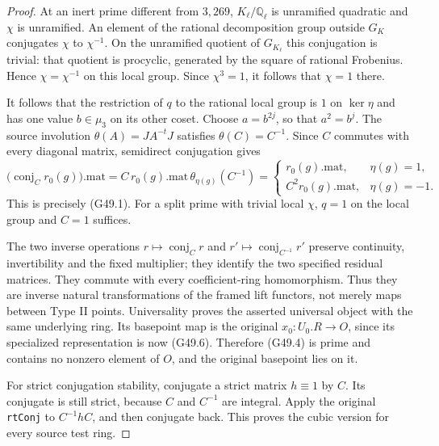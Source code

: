 \begin{proof}
At an inert prime different from $3,269$, $K_\ell/\mathbb Q_\ell$
is unramified quadratic and $\chi$ is unramified.
An element of the rational decomposition group outside $G_K$
conjugates $\chi$ to $\chi^{-1}$.  On the unramified quotient
of $G_{K_\ell}$ this conjugation is trivial: that quotient is
procyclic, generated by the square of rational Frobenius.
Hence $\chi=\chi^{-1}$ on this local group.  Since $\chi^3=1$,
it follows that $\chi=1$ there.

It follows that the restriction of $q$ to the rational local
group is $1$ on $\ker\eta$ and has one value $b\in\mu_3$
on its other coset.  Choose $a=b^{2j}$, so that $a^2=b^j$.
The source involution $\theta(A)=JA^{-t}J$ satisfies
$\theta(C)=C^{-1}$.  Since $C$ commutes with every diagonal
matrix, semidirect conjugation gives
\[
 \bigl(\operatorname{conj}_C r_0(g)\bigr).\mathrm{mat}
   = C\,r_0(g).\mathrm{mat}\,
                 \theta_{\eta(g)}(C^{-1})
   =\begin{cases}
       r_0(g).\mathrm{mat},&\eta(g)=1,\\
       C^2r_0(g).\mathrm{mat},&\eta(g)=-1.
     \end{cases}                                                \tag{G49.6}
\]
This is precisely (G49.1).  For a split prime with trivial
local $\chi$, $q=1$ on the local group and $C=1$ suffices.

The two inverse operations $r\mapsto\operatorname{conj}_C r$
and $r'\mapsto\operatorname{conj}_{C^{-1}}r'$ preserve
continuity, invertibility and the fixed multiplier; they
identify the two specified residual matrices.  They commute
with every coefficient-ring homomorphism.  Thus they are
inverse natural transformations of the framed lift functors,
not merely maps between Type II points.  Universality proves
the asserted universal object with the same underlying ring.
Its basepoint map is the original $x_0:U_0.R\to O$, since
its specialized representation is now (G49.6).  Therefore
(G49.4) is prime and contains no nonzero element of $O$,
and the original basepoint lies on it.

For strict conjugation stability, conjugate a strict matrix
$h\equiv1$ by $C$.  Its conjugate is still strict, because
$C$ and $C^{-1}$ are integral.  Apply the original
\texttt{rtConj} to $C^{-1}hC$, and then conjugate back.
This proves the cubic version for every source test ring.


\end{proof}
